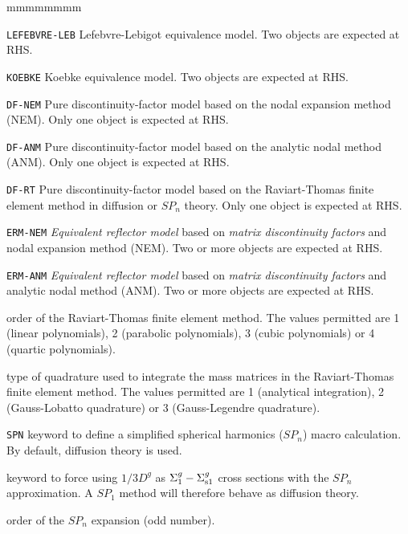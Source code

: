 \begin{ListeDeDescription}{mmmmmmmm}
\item[{\tt LEFEBVRE-LEB}] Lefebvre-Lebigot equivalence model. Two  objects are expected at RHS.\cite{LLB,Frohlicher}
\item[{\tt KOEBKE}] Koebke equivalence model. Two  objects are expected at RHS.\cite{Koebke,Frohlicher}
\item[{\tt DF-NEM}] Pure discontinuity-factor model based on the nodal expansion method (NEM). Only one  object is expected at RHS.
\item[{\tt DF-ANM}] Pure discontinuity-factor model based on the analytic nodal method (ANM). Only one  object is expected at RHS.
\item[{\tt DF-RT}] Pure discontinuity-factor model based on the Raviart-Thomas finite element method in diffusion or $SP_n$ theory. Only one  object is expected at RHS.
\item[{\tt ERM-NEM}] {\sl Equivalent reflector model} based on {\sl matrix discontinuity factors} and nodal expansion method (NEM).
Two or more  objects are expected at RHS.
\item[{\tt ERM-ANM}] {\sl Equivalent reflector model} based on {\sl matrix discontinuity factors} and analytic nodal method (ANM).
Two or more  objects are expected at RHS.

\item[\dusa{ielem}] order of the Raviart-Thomas finite element method.  The values
permitted are 1 (linear polynomials), 2 (parabolic polynomials), 3 (cubic polynomials) or 4 (quartic polynomials).

\item[\dusa{icol}] type of quadrature used to integrate the mass matrices in the Raviart-Thomas finite element method. The
values permitted are 1 (analytical integration), 2  (Gauss-Lobatto quadrature) or 3 (Gauss-Legendre quadrature).

\item[{\tt SPN}] keyword to define a simplified spherical harmonics ($SP_n$) macro calculation. By default, diffusion theory is used.

\item[\moc{DIFF}] keyword to force using $1/3D^{g}$ as $\Sigma_1^{g}-\Sigma_{{\rm s}1}^{g}$ cross sections with the $SP_n$ approximation. A $SP_1$ method
will therefore behave as diffusion theory.

\item[\dusa{nlf}] order of the $SP_n$ expansion (odd number).


\end{ListeDeDescription}
